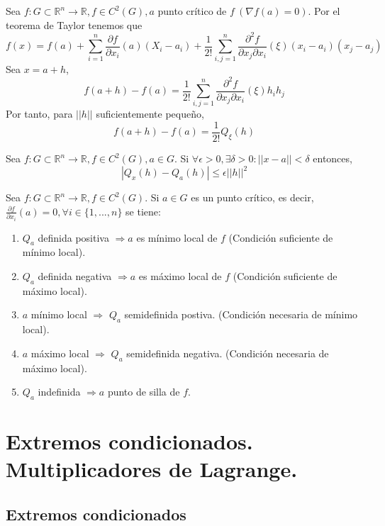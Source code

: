 \begin{ejm}
Sea $f:G\subset\mathbb{R}^n\rightarrow\mathbb{R}, f\in C^2(G), a$ punto crítico de $f \ (\nabla{f}(a)=0)$. Por el teorema de Taylor tenemos que \[ f(x) = f(a) + \sum_{i=1}^n \frac{\partial f}{\partial x_i}(a)(X_i - a_i) + \frac{1}{2!}\sum_{i,j=1}^n \frac{\partial^2 f}{\partial x_j \partial x_i}(\xi)(x_i - a_i)(x_j - a_j)\] Sea $x = a + h$, \[ f(a+h) - f(a) = \frac{1}{2!}\sum_{i,j=1}^n \frac{\partial^2 f}{\partial x_j \partial x_i}(\xi)h_i h_j \] Por tanto, para $||h||$ suficientemente pequeño, \[f(a+h) - f(a) = \frac{1}{2!} Q_{\xi}(h) \]
\end{ejm}

\begin{prop}
Sea $f:G\subset\mathbb{R}^n\rightarrow\mathbb{R}, f\in C^2(G), a\in G$. Si $\forall \epsilon > 0, \exists \delta >0: || x - a|| < \delta$ entonces, \[ |Q_x(h) - Q_a(h)| \leq \epsilon||h||^2 \]
\end{prop}

\begin{theo}
Sea $f:G\subset\mathbb{R}^n\rightarrow\mathbb{R}, f\in C^2(G).$ Si $a\in G$ es un punto crítico, es decir, $\frac{\partial f}{\partial x_i}(a) = 0, \forall i \in \{1,...,n\}$ se tiene:

\begin{enumerate}[label=(\roman*)]
    \item $Q_a$ definida positiva $\Rightarrow a$ es mínimo local de $f$ (Condición suficiente de mínimo local).
    \item $Q_a$ definida negativa $\Rightarrow a$ es máximo local de $f$ (Condición suficiente de máximo local). 
    \item $a$ mínimo local $\Rightarrow$ $Q_a$ semidefinida postiva. (Condición necesaria de mínimo local).
    \item $a$ máximo local  $\Rightarrow$ $Q_a$ semidefinida negativa. (Condición necesaria de máximo local).
    \item $Q_a$ indefinida $\Rightarrow a$ punto de silla de $f$.
\end{enumerate}
\end{theo}

\chapter{Extremos condicionados. Multiplicadores de Lagrange.}

\section{Extremos condicionados}

